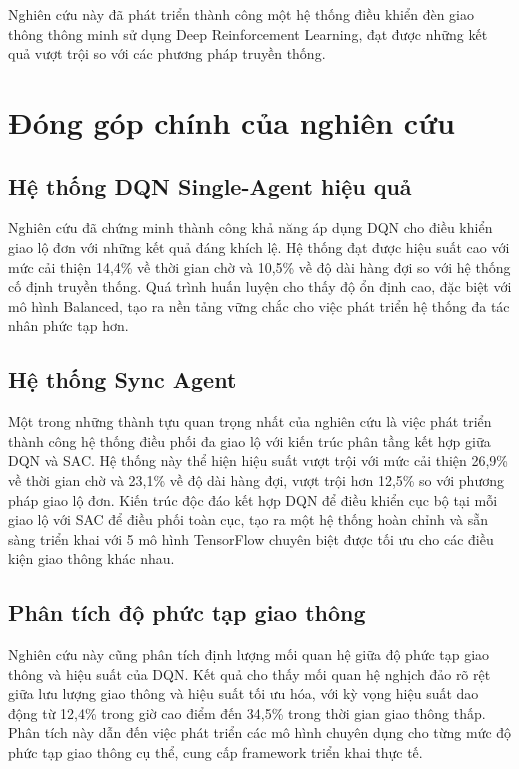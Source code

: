 Nghiên cứu này đã phát triển thành công một hệ thống điều khiển đèn giao thông thông minh sử dụng Deep Reinforcement Learning, đạt được những kết quả vượt trội so với các phương pháp truyền thống.

\section{Đóng góp chính của nghiên cứu}

\subsection{Hệ thống DQN Single-Agent hiệu quả}
Nghiên cứu đã chứng minh thành công khả năng áp dụng DQN cho điều khiển giao lộ đơn với những kết quả đáng khích lệ. Hệ thống đạt được hiệu suất cao với mức cải thiện 14,4\% về thời gian chờ và 10,5\% về độ dài hàng đợi so với hệ thống cố định truyền thống. Quá trình huấn luyện cho thấy độ ổn định cao, đặc biệt với mô hình Balanced, tạo ra nền tảng vững chắc cho việc phát triển hệ thống đa tác nhân phức tạp hơn.

\subsection{Hệ thống Sync Agent}
Một trong những thành tựu quan trọng nhất của nghiên cứu là việc phát triển thành công hệ thống điều phối đa giao lộ với kiến trúc phân tầng kết hợp giữa DQN và SAC. Hệ thống này thể hiện hiệu suất vượt trội với mức cải thiện 26,9\% về thời gian chờ và 23,1\% về độ dài hàng đợi, vượt trội hơn 12,5\% so với phương pháp giao lộ đơn. Kiến trúc độc đáo kết hợp DQN để điều khiển cục bộ tại mỗi giao lộ với SAC để điều phối toàn cục, tạo ra một hệ thống hoàn chỉnh và sẵn sàng triển khai với 5 mô hình TensorFlow chuyên biệt được tối ưu cho các điều kiện giao thông khác nhau.

\subsection{Phân tích độ phức tạp giao thông}
Nghiên cứu này cũng phân tích định lượng mối quan hệ giữa độ phức tạp giao thông và hiệu suất của DQN. Kết quả cho thấy mối quan hệ nghịch đảo rõ rệt giữa lưu lượng giao thông và hiệu suất tối ưu hóa, với kỳ vọng hiệu suất dao động từ 12,4\% trong giờ cao điểm đến 34,5\% trong thời gian giao thông thấp. Phân tích này dẫn đến việc phát triển các mô hình chuyên dụng cho từng mức độ phức tạp giao thông cụ thể, cung cấp framework triển khai thực tế.

